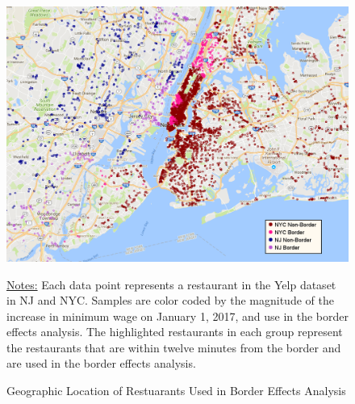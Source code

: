 \documentclass[11pt]{article}
\begin{document}
\begin{figure}[H]
\centering
\caption{Geographic Location of Restuarants Used in Border Effects Analysis}
\includegraphics[width=6in]{border.png}

{\footnotesize \raggedright \underline{Notes:} Each data point represents a restaurant in the Yelp dataset in NJ and NYC. Samples are color coded by the magnitude of the increase in minimum wage on January 1, 2017, and use in the border effects analysis. The highlighted restaurants in each group represent the restaurants that are within twelve minutes from the border and are used in the border effects analysis. \par
}
\end{figure}

\vspace*{\fill}

\newpage

\vspace*{\fill}
\end{document}
